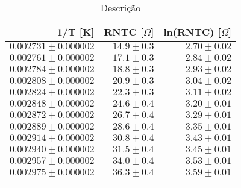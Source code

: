 
        \def\arraystretch{1.2}
        \begin{table}[H]
            \centering
            \caption{Descrição}
            \begin{tabular}{r|r|r}
            \toprule
            \midrule
1/T [K] & RNTC [$\Omega$] & ln(RNTC) [$\Omega$] \\\hline
$0.002731 \pm 0.000002$ & $14.9 \pm 0.3$ & $2.70 \pm 0.02$ \\
$0.002761 \pm 0.000002$ & $17.1 \pm 0.3$ & $2.84 \pm 0.02$ \\
$0.002784 \pm 0.000002$ & $18.8 \pm 0.3$ & $2.93 \pm 0.02$ \\
$0.002808 \pm 0.000002$ & $20.9 \pm 0.3$ & $3.04 \pm 0.02$ \\
$0.002824 \pm 0.000002$ & $22.3 \pm 0.3$ & $3.11 \pm 0.02$ \\
$0.002848 \pm 0.000002$ & $24.6 \pm 0.4$ & $3.20 \pm 0.01$ \\
$0.002872 \pm 0.000002$ & $26.7 \pm 0.4$ & $3.29 \pm 0.01$ \\
$0.002889 \pm 0.000002$ & $28.6 \pm 0.4$ & $3.35 \pm 0.01$ \\
$0.002914 \pm 0.000002$ & $30.8 \pm 0.4$ & $3.43 \pm 0.01$ \\
$0.002940 \pm 0.000002$ & $31.5 \pm 0.4$ & $3.45 \pm 0.01$ \\
$0.002957 \pm 0.000002$ & $34.0 \pm 0.4$ & $3.53 \pm 0.01$ \\
$0.002975 \pm 0.000002$ & $36.3 \pm 0.4$ & $3.59 \pm 0.01$ \\
            \bottomrule
            \label{etiqueta}
            \end{tabular}
        \end{table}

